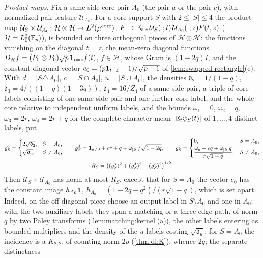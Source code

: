 \emph{Product maps.} Fix a same-side core pair $A_0$ (the pair $a$ or the pair $c$), with
normalized pair feature $\mathcal U_{A_0}$. For a core support $S$ with $2\le|S|\le4$ the
product map $\mathcal U_S\times\mathcal U_{A_0}\colon\mathcal H\otimes\mathcal H\to L^2(\mu^{\rm core})$,
$F\mapsto\mathbb E_{t,z}\,\mathcal U_S(\cdot;t)\,\mathcal U_{A_0}(\cdot;z)F(t,z)$
($\mathcal H=L^2_0(\mathbb F_p)$), is bounded on three orthogonal pieces of $\mathcal H\otimes\mathcal H$: the functions
vanishing on the diagonal $t=z$, the mean-zero diagonal functions
$D_{\mathcal H}f=(P_0\otimes P_0)\sqrt p\,\mathbf 1_{t=z}f(t)$, $f\in\mathcal H$, whose Gram is $(1-2q)I$, and the
constant diagonal vector $e_0=(p\mathbf 1_{t=z}-1)/\sqrt{p-1}$ of
\cref{lem:swapped-rectangle}(c). With $d=|S\triangle A_0|$, $c=|S\cap A_0|$,
$u=|S\cup A_0|$, the densities $\mathfrak d_2=1/(1-q)$, $\mathfrak d_3=4/((1-q)(1-3q))$,
$\mathfrak d_4=16/Z_4$ of a same-side pair, a triple of core labels
consisting of one same-side pair and one further core label, and the whole
core relative to independent uniform labels, and the bounds $\omega_1=0$, $\omega_2=q$,
$\omega_3=2r$, $\omega_4=2r+q$ for the complete character mean $|\mathbb E_t\psi_S(t)|$ of
$1,\dots,4$ distinct labels, put
\begin{gather*}
 \varrho^o_S=\begin{cases}2\sqrt{\mathfrak d_2},&S=A_0,\\\sqrt{\mathfrak d_u},&S\ne A_0,\end{cases}
 \qquad
 \varrho^d_S=\mathbf 1_{d\ne0}+cr+q+\omega_{|S|}/\sqrt{1-2q},\qquad
 \varrho^c_S=\begin{cases}0,&S=A_0,\\[2pt]
 \dfrac{\omega_d+cq+\omega_{|S|}q}{r\sqrt{1-q}},&S\ne A_0,\end{cases}\\
 R_S=\bigl((\varrho^o_S)^2+(\varrho^d_S)^2+(\varrho^c_S)^2\bigr)^{1/2}.
\end{gather*}
Then $\mathcal U_S\times\mathcal U_{A_0}$ has norm at most $R_S$, except that for $S=A_0$
the vector $e_0$ has the constant image $h_{A_0}\mathbf 1$,
$h_{A_0}=(1-2q-q^2)/(r\sqrt{1-q})$, which is set apart. Indeed, on the off-diagonal piece
choose an output label in $S\setminus A_0$ and one in $A_0$: with the two auxiliary labels
they span a matching or a three-edge path, of norm $q$ by two Paley transforms
(\cref{lem:matching:kernel}(a)), the other labels entering as bounded multipliers and the
density of the $u$ labels costing $\sqrt{\mathfrak d_u}$; for $S=A_0$ the incidence is a
$K_{2,2}$, of counting norm $2p$ (\cref{thm:dl:K}), whence $2q$; the separate distinctness

